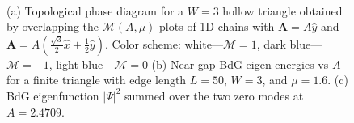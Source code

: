 
\begin{figure}[!ht]
  \hspace{28pt}
  \hspace{-40pt}
   \\
  \hspace{70pt}
  \caption{(a) Topological phase diagram for a $W=3$ hollow triangle obtained by overlapping the $\mathcal{M}(A, \mu)$ plots of 1D chains with $\mathbf A = A\hat{y}$ and $\mathbf A = A(\frac{\sqrt{      3}}{2}\hat{x}+\frac{1}{2}\hat{y})$. Color scheme: white---$\mathcal{M}=1$, dark blue---$\mathcal{M}=-1$, light blue---$\mathcal{M}=0$ (b) Near-gap BdG eigen-energies vs $A$ for a finite triangle with edge length $L=50$, $W=3$, and $\mu=1.6$. (c) BdG eigenfunction $|\Psi|^2$ summed over the two zero modes at $A=2.4709$.}
  \label{fig: supp pd}
\end{figure}

